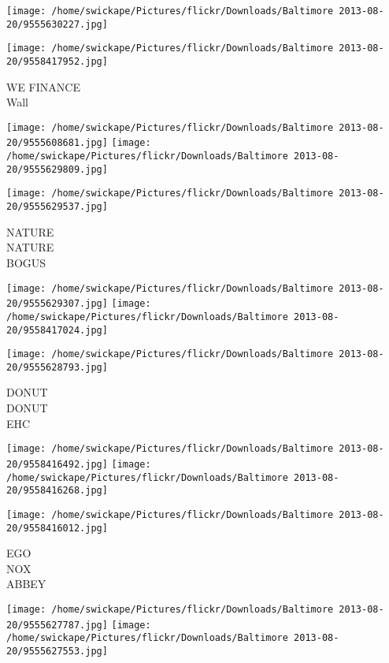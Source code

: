 \documentclass[10pt,letterpaper]{article}
\begin{document}
\texttt{[image: /home/swickape/Pictures/flickr/Downloads/Baltimore 2013-08-20/9555630227.jpg]}

\vspace{0.25in}
\texttt{[image: /home/swickape/Pictures/flickr/Downloads/Baltimore 2013-08-20/9558417952.jpg]}

WE FINANCE\\
Wall\\
\pagebreak

\texttt{[image: /home/swickape/Pictures/flickr/Downloads/Baltimore 2013-08-20/9555608681.jpg]}
\texttt{[image: /home/swickape/Pictures/flickr/Downloads/Baltimore 2013-08-20/9555629809.jpg]}

\vspace{0.25in}
\texttt{[image: /home/swickape/Pictures/flickr/Downloads/Baltimore 2013-08-20/9555629537.jpg]}

NATURE\\
NATURE\\
BOGUS\\
\pagebreak

\texttt{[image: /home/swickape/Pictures/flickr/Downloads/Baltimore 2013-08-20/9555629307.jpg]}
\texttt{[image: /home/swickape/Pictures/flickr/Downloads/Baltimore 2013-08-20/9558417024.jpg]}

\vspace{0.25in}
\texttt{[image: /home/swickape/Pictures/flickr/Downloads/Baltimore 2013-08-20/9555628793.jpg]}

DONUT\\
DONUT\\
EHC\\
\pagebreak

\texttt{[image: /home/swickape/Pictures/flickr/Downloads/Baltimore 2013-08-20/9558416492.jpg]}
\texttt{[image: /home/swickape/Pictures/flickr/Downloads/Baltimore 2013-08-20/9558416268.jpg]}

\vspace{0.25in}
\texttt{[image: /home/swickape/Pictures/flickr/Downloads/Baltimore 2013-08-20/9558416012.jpg]}

EGO\\
NOX\\
ABBEY\\
\pagebreak

\texttt{[image: /home/swickape/Pictures/flickr/Downloads/Baltimore 2013-08-20/9555627787.jpg]}
\texttt{[image: /home/swickape/Pictures/flickr/Downloads/Baltimore 2013-08-20/9555627553.jpg]}
\end{document}
